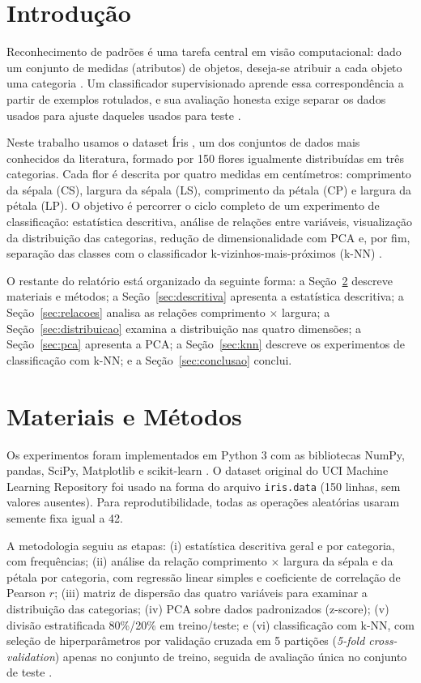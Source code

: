\documentclass[conference]{IEEEtran}
\begin{document}
\section{Introdução}
Reconhecimento de padrões é uma tarefa central em visão computacional: dado um conjunto de medidas (atributos) de objetos, deseja-se atribuir a cada objeto uma categoria \cite{todt2026}. Um classificador supervisionado aprende essa correspondência a partir de exemplos rotulados, e sua avaliação honesta exige separar os dados usados para ajuste daqueles usados para teste \cite{todt2026knn}.

Neste trabalho usamos o dataset Íris \cite{fisher1936,uciiris}, um dos conjuntos de dados mais conhecidos da literatura, formado por 150 flores igualmente distribuídas em três categorias. Cada flor é descrita por quatro medidas em centímetros: comprimento da sépala (CS), largura da sépala (LS), comprimento da pétala (CP) e largura da pétala (LP). O objetivo é percorrer o ciclo completo de um experimento de classificação: estatística descritiva, análise de relações entre variáveis, visualização da distribuição das categorias, redução de dimensionalidade com PCA e, por fim, separação das classes com o classificador k-vizinhos-mais-próximos (k-NN) \cite{todt2026knn}.

O restante do relatório está organizado da seguinte forma: a Seção~\ref{sec:metodos} descreve materiais e métodos; a Seção~\ref{sec:descritiva} apresenta a estatística descritiva; a Seção~\ref{sec:relacoes} analisa as relações comprimento $\times$ largura; a Seção~\ref{sec:distribuicao} examina a distribuição nas quatro dimensões; a Seção~\ref{sec:pca} apresenta a PCA; a Seção~\ref{sec:knn} descreve os experimentos de classificação com k-NN; e a Seção~\ref{sec:conclusao} conclui.

\section{Materiais e Métodos}
\label{sec:metodos}
Os experimentos foram implementados em Python 3 com as bibliotecas NumPy, pandas, SciPy, Matplotlib e scikit-learn \cite{sklearn}. O dataset original do UCI Machine Learning Repository \cite{uciiris} foi usado na forma do arquivo \texttt{iris.data} (150 linhas, sem valores ausentes). Para reprodutibilidade, todas as operações aleatórias usaram semente fixa igual a 42.

A metodologia seguiu as etapas: (i) estatística descritiva geral e por categoria, com frequências; (ii) análise da relação comprimento $\times$ largura da sépala e da pétala por categoria, com regressão linear simples e coeficiente de correlação de Pearson $r$; (iii) matriz de dispersão das quatro variáveis para examinar a distribuição das categorias; (iv) PCA sobre dados padronizados (z-score); (v) divisão estratificada 80\%/20\% em treino/teste; e (vi) classificação com k-NN, com seleção de hiperparâmetros por validação cruzada em 5 partições (\textit{5-fold cross-validation}) apenas no conjunto de treino, seguida de avaliação única no conjunto de teste \cite{todt2026knn}.
\end{document}
